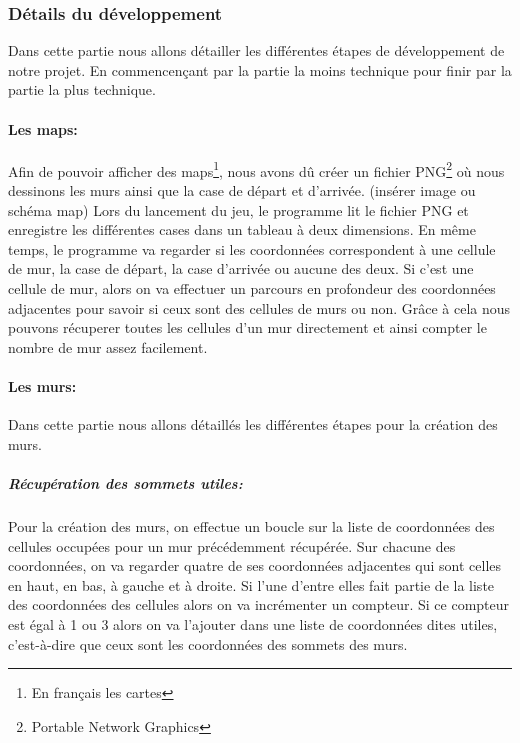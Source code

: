 \documentclass[12pt]{report}
\begin{document}
\subsubsection{Détails du développement}

Dans cette partie nous allons détailler les différentes étapes de développement
de notre projet. En commencençant par la partie la moins technique pour finir
par la partie la plus technique.

\paragraph{Les maps:}
Afin de pouvoir afficher des maps\footnote{En français les cartes}, 
nous avons dû créer un fichier PNG\footnote{Portable Network Graphics} où
nous dessinons les murs ainsi que la case de départ et d'arrivée. (insérer image ou schéma map)
Lors du lancement du jeu, le programme lit le fichier PNG et enregistre les
différentes cases dans un tableau à deux dimensions. En même temps, le programme
va regarder si les coordonnées correspondent à une cellule de mur, la case 
de départ, la case d'arrivée ou aucune des deux. Si c'est une cellule de mur, 
alors on va effectuer un parcours en profondeur des coordonnées adjacentes 
pour savoir si ceux sont des cellules de murs ou non. Grâce à cela nous 
pouvons récuperer toutes les cellules d'un mur directement et ainsi compter 
le nombre de mur assez facilement.

\paragraph{Les murs:}

Dans cette partie nous allons détaillés les différentes étapes pour la création
des murs.

\subparagraph{Récupération des sommets utiles:}

Pour la création des murs, on effectue un boucle sur la liste de coordonnées
des cellules occupées pour un mur précédemment récupérée. Sur chacune des 
coordonnées, on va regarder quatre de ses coordonnées adjacentes qui sont celles
en haut, en bas, à gauche et à droite. Si l'une d'entre elles fait partie de 
la liste des coordonnées des cellules alors on va incrémenter un compteur.
Si ce compteur est égal à 1 ou 3 alors on va l'ajouter dans une liste de coordonnées
dites utiles, c'est-à-dire que ceux sont les coordonnées des sommets des murs.
\end{document}
